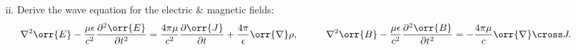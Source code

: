 \documentclass{article}
\begin{document}
{\begin{enumerate}
\begin{enumerate}
				\paragraph{Solution} \unboldmath  
				\begin{equation*}
					\begin{split}
						\orr{\nabla} \cdot \left( \orr{\nabla} \cross \orr{B} \right) &= \frac{4\pi \mu}{c} \orr{\nabla} \cdot \orr{J} + \frac{\mu \epsilon}{c} \frac{\partial}{\partial t}\left( \orr{\nabla} \cdot \orr{E} \right) \\
						0 &= \frac{4\pi \mu}{c} \orr{\nabla} \cdot \orr{J} + \frac{\mu \epsilon}{c} \frac{\partial}{\partial t}\left( \frac{4\pi \rho}{\epsilon} \right) \\
						0 &= \frac{4\pi \mu}{c} \orr{\nabla} \cdot \orr{J} + \frac{4\pi \mu}{c} \frac{\partial \rho}{\partial t} \\
						\orr{\nabla} \cdot \orr{J} + \frac{\partial \rho}{\partial t} &= 0 
					\end{split}
				\end{equation*} \boldmath
	\clearpage
				\item[ii.] Derive the wave equation for the electric \& magnetic fields:
				\begin{equation*}
					\begin{aligned}
						\nabla^2 \orr{E} - \frac{\mu \epsilon}{c^2} \frac{\partial^2 \orr{E}}{\partial t^2} &= \frac{4\pi \mu}{c^2} \frac{\partial \orr{J}}{\partial t} + \frac{4\pi}{\epsilon} \orr{\nabla} \rho, & \quad \quad \nabla^2 \orr{B} - \frac{\mu \epsilon}{c^2} \frac{\partial^2 \orr{B}}{\partial t^2} &= -\frac{4\pi \mu}{c} \orr{\nabla} \cross J.
					\end{aligned}
				\end{equation*}

\end{enumerate}
\end{enumerate}}
\end{document}
